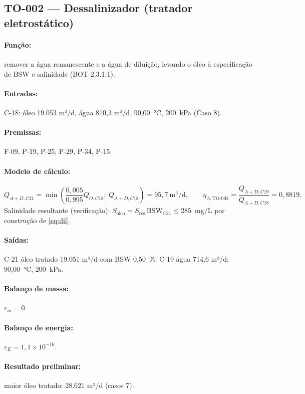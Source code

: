 \documentclass[11pt,a4paper]{article}
\numberwithin{equation}{section}
\numberwithin{table}{section}
\numberwithin{figure}{section}
\begin{document}
\subsection{TO-002 --- Dessalinizador (tratador eletrostático)}
\paragraph{Função:} remover a água remanescente e a água de diluição, levando o óleo à especificação de BSW e salinidade (BOT 2.3.1.1).
\paragraph{Entradas:} C-18: óleo 19.053 m³/d, água 810,3 m³/d, 90,00~\si{\celsius}, 200~\si{\kilo\pascal} (Caso 8).
\paragraph{Premissas:} F-09, P-19, P-25, P-29, P-34, P-15.
\paragraph{Modelo de cálculo:}
\begin{equation}
Q_{A+D,C21}=\min\!\left(\frac{0{,}005}{0{,}995}Q_{O,C18};\ Q_{A+D,C18}\right)=95{,}7\ \mathrm{m^3/d},\qquad \eta_{A,\mbox{TO-002}}=\frac{Q_{A+D,C19}}{Q_{A+D,C18}}=0{,}8819.
\end{equation}
Salinidade resultante (verificação): $S_{\text{óleo}}=S_{\mathrm{res}}\,\mathrm{BSW}_{C21}\le 285$~mg/L por construção de \eqref{eq:dil}.

\paragraph{Saídas:} C-21 óleo tratado 19.051 m³/d com BSW 0,50~\%; C-19 água 714,6 m³/d; 90,00~\si{\celsius}, 200~\si{\kilo\pascal}.
\paragraph{Balanço de massa:} $\varepsilon_m=$$0$.
\paragraph{Balanço de energia:} $\varepsilon_E=$$1{,}1\times10^{-16}$.
\paragraph{Resultado preliminar:} maior óleo tratado: 28.621 m³/d (casos 7).
\end{document}
